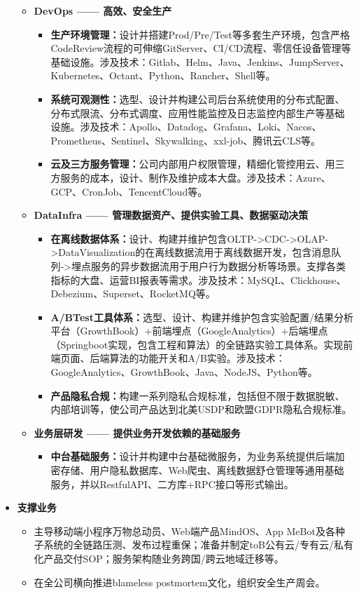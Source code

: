 \documentclass[letterpaper,11pt]{article}
\begin{document}
\begin{spacing}{0.9}
\begin{itemize}
\begin{itemize}
				\item \textbf{DevOps —— 高效、安全生产}
				\begin{itemize}
					\item \textbf{生产环境管理：}设计并搭建Prod/Pre/Test等多套生产环境，包含严格CodeReview流程的可伸缩GitServer、CI/CD流程、零信任设备管理等基础设施。涉及技术：Gitlab、Helm、Java、Jenkins、JumpServer、Kubernetes、Octant、Python、Rancher、Shell等。
					\item \textbf{系统可观测性：}选型、设计并构建公司后台系统使用的分布式配置、分布式限流、分布式调度、应用性能监控及日志监控内部生产等基础设施。涉及技术：Apollo、Datadog、Grafana、Loki、Nacos、Prometheus、Sentinel、Skywalking、xxl-job、腾讯云CLS等。
					\item \textbf{云及三方服务管理：}公司内部用户权限管理，精细化管控用云、用三方服务的成本，设计、制作及维护成本大盘。涉及技术：Azure、GCP、CronJob、TencentCloud等。
				\end{itemize}
				
				\item \textbf{DataInfra —— 管理数据资产、提供实验工具、数据驱动决策}
				\begin{itemize}
					\item     \textbf{在离线数据体系：}设计、构建并维护包含OLTP->CDC->OLAP->DataVisualization的在离线数据流用于离线数据开发，包含消息队列->埋点服务的异步数据流用于用户行为数据分析等场景。支撑各类指标的大盘、运营BI报表等需求。涉及技术：MySQL、Clickhouse、Debezium、Superset、RocketMQ等。
					\item
					\textbf{A/BTest工具体系：}选型、设计、构建并维护包含实验配置/结果分析平台（GrowthBook）+前端埋点（GoogleAnalytics）+后端埋点（Springboot实现，包含工程和算法）的全链路实验工具体系。实现前端页面、后端算法的功能开关和A/B实验。涉及技术：GoogleAnalytics、GrowthBook、Java、NodeJS、Python等。
					\item
					\textbf{产品隐私合规：}构建一系列隐私合规标准，包括但不限于数据脱敏、内部培训等，使公司产品达到北美USDP和欧盟GDPR隐私合规标准。
				\end{itemize}
				
				\item \textbf{业务层研发 —— 提供业务开发依赖的基础服务}
				\begin{itemize}
					\item \textbf{中台基础服务：}设计并构建中台基础微服务，为业务系统提供后端加密存储、用户隐私数据库、Web爬虫、离线数据舒仓管理等通用基础服务，并以RestfulAPI、二方库+RPC接口等形式输出。
				\end{itemize}
			\end{itemize}
			\item \textbf{支撑业务}
			\begin{itemize}
				\item 主导移动端小程序万物总动员、Web端产品MindOS、App MeBot及各种子系统的全链路压测、发布过程重保；准备并制定toB公有云/专有云/私有化产品交付SOP；服务架构随业务跨国/跨云地域迁移等。
				\item 在全公司横向推进blameless postmortem文化，组织安全生产周会。
			\end{itemize}
		\end{itemize}
		

\end{spacing}
\end{document}
